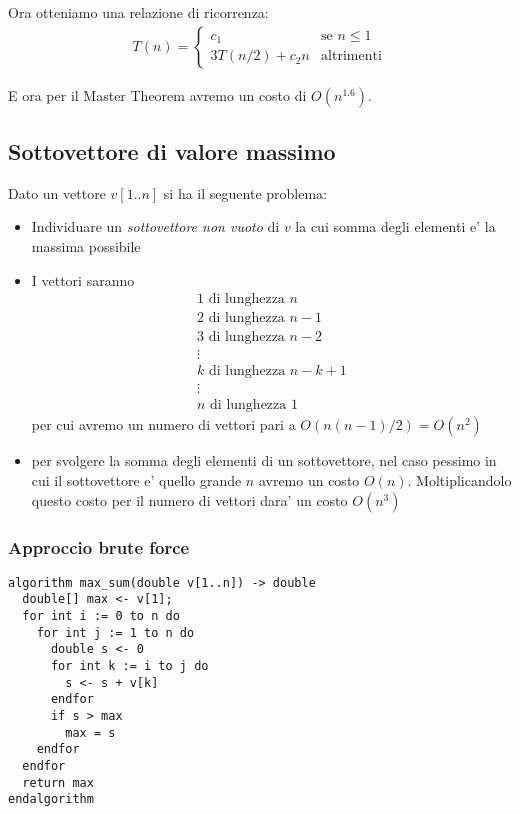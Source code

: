 \documentclass{article}
\begin{document}
Ora otteniamo una relazione di ricorrenza:
\begin{align*}
  T(n) = \begin{cases}
    c_1 &\text{se } n \leq 1 \\
    3 T(n/2) + c_2 n &\text{altrimenti}
\end{cases}
\end{align*}

E ora per il Master Theorem avremo un costo di $O(n^{1.6})$.

\subsection{Sottovettore di valore massimo}

Dato un vettore $v[1..n]$ si ha il seguente problema:
\begin{itemize}
  \item Individuare un \emph{sottovettore non vuoto} di $v$ la cui somma
    degli elementi e' la massima possibile
  \item I vettori saranno
    \begin{equation*}
    \begin{split}
      1 \text{ di lunghezza } n \\
      2 \text{ di lunghezza } n-1 \\
      3 \text{ di lunghezza } n-2 \\
      \vdots \\
      k \text{ di lunghezza } n-k+1 \\
      \vdots \\
      n \text{ di lunghezza } 1
    \end{split}
    \end{equation*}
    per cui avremo un numero di vettori pari a $O(n(n-1)/2) = O(n^2)$
  \item per svolgere la somma degli elementi di un sottovettore, nel caso pessimo
    in cui il sottovettore e' quello grande $n$ avremo un costo $O(n)$.
    Moltiplicandolo questo costo per il numero di vettori dara' un costo $O(n^3)$
\end{itemize}

\subsubsection{Approccio brute force}

\begin{lstlisting}
algorithm max_sum(double v[1..n]) -> double
  double[] max <- v[1];
  for int i := 0 to n do
    for int j := 1 to n do
      double s <- 0
      for int k := i to j do
        s <- s + v[k]
      endfor
      if s > max
        max = s
    endfor
  endfor
  return max
endalgorithm
\end{lstlisting}
\end{document}
